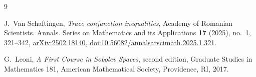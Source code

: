 \documentclass[11pt]{article}
\begin{document}
\begin{thebibliography}{9}

J.~Van Schaftingen,
\emph{Trace conjunction inequalities},
Academy of Romanian Scientists. Annals. Series on Mathematics and its
Applications \textbf{17} (2025), no.~1, 321--342,
\href{https://arxiv.org/abs/2502.18140}{arXiv:2502.18140},
\href{https://doi.org/10.56082/annalsarscimath.2025.1.321}
{doi:10.56082/annalsarscimath.2025.1.321}.

G.~Leoni,
\emph{A First Course in Sobolev Spaces}, second edition,
Graduate Studies in Mathematics 181, American Mathematical Society,
Providence, RI, 2017.

\end{thebibliography}
\end{document}
